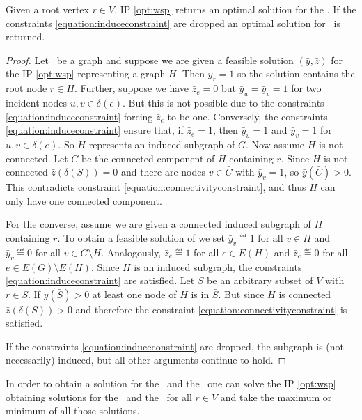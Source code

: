 \begin{theorem}
	\label{thm:optwsp}
	 Given a root vertex $r \in V$, IP \eqref{opt:wsp} returns an optimal solution for the \RWISP. If the constraints \eqref{equation:induceconstraint} are dropped an optimal solution for \RWSP\ is returned.
\end{theorem}
\begin{proof}
	Let \ugraph\ be a graph and suppose we are given a feasible solution $(\bar{y}, \bar{z})$ for the IP \eqref{opt:wsp} representing a graph $H$. Then $\bar{y}_r = 1$ so the solution contains the root node $r \in H$. Further, suppose we have $\bar{z}_e = 0$ but $\bar{y}_u = \bar{y}_v = 1$ for two incident nodes $u, v \in \delta(e)$. But this is not possible due to the constraints \eqref{equation:induceconstraint} forcing $\bar{z}_e$ to be one. Conversely, the constraints \eqref{equation:induceconstraint} ensure that, if $\bar{z}_e = 1$, then $\bar{y}_u = 1$ and $\bar{y}_v = 1$ for $u, v \in \delta(e)$. So $H$ represents an induced subgraph of $G$. Now assume $H$ is not connected. Let $C$ be the connected component of $H$ containing $r$. Since $H$ is not connected $\bar{z}(\delta(S)) = 0$ and there are nodes $v \in \bar{C}$ with $\bar{y}_v = 1$, so $\bar{y}(\bar{C}) > 0$. This contradicts constraint \eqref{equation:connectivityconstraint}, and thus $H$ can only have one connected component.\medskip
	
	For the converse, assume we are given a connected induced subgraph of $H$ containing $r$. To obtain a feasible solution of we set $\bar{y}_v \eqdef 1$ for all $v \in H$ and $\bar{y}_v \eqdef 0$ for all $v \in G \setminus H$. Analogously, $\bar{z}_e \eqdef 1$ for all $e \in E(H)$ and $\bar{z}_e \eqdef 0$ for all $e \in E(G) \setminus E(H)$. Since $H$ is an induced subgraph, the constraints \eqref{equation:induceconstraint} are satisfied. Let $S$ be an arbitrary subset of $V$ with $r \in S$. If $y(\bar{S}) > 0$ at least one node of $H$ is in $\bar{S}$. But since $H$ is connected $\bar{z}(\delta(S)) > 0$ and therefore the constraint \eqref{equation:connectivityconstraint} is satisfied.\medskip
	
	If the constraints \eqref{equation:induceconstraint} are dropped, the subgraph is (not necessarily) induced, but all other arguments continue to hold.
\end{proof}

\begin{corollary}
	\label{corollary:optrwsp}
	In order to obtain a solution for the \WSP\ and the \WISP\ one can solve the IP \eqref{opt:wsp} obtaining solutions for the \RWSP\ and the \RWISP\ for all $r \in V$  and take the maximum or minimum of all those solutions.
\end{corollary}


